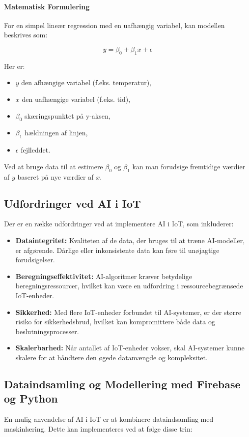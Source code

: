 \paragraph{Matematisk Formulering}
For en simpel lineær regression med en uafhængig variabel, kan modellen beskrives som:

\[
y = \beta_0 + \beta_1 x + \epsilon
\]

Her er:
\begin{itemize}
	\item \(y\) den afhængige variabel (f.eks. temperatur),
	\item \(x\) den uafhængige variabel (f.eks. tid),
	\item \(\beta_0\) skæringspunktet på y-aksen,
	\item \(\beta_1\) hældningen af linjen,
	\item \(\epsilon\) fejlleddet.
\end{itemize}
\noindent Ved at bruge data til at estimere \(\beta_0\) og \(\beta_1\) kan man forudsige fremtidige værdier af \(y\) baseret på nye værdier af \(x\).

\subsection{Udfordringer ved AI i IoT}
Der er en række udfordringer ved at implementere AI i IoT, som inkluderer:
\begin{itemize}
	\item \textbf{Dataintegritet:} Kvaliteten af de data, der bruges til at træne AI-modeller, er afgørende. Dårlige eller inkonsistente data kan føre til unøjagtige forudsigelser.
	\item \textbf{Beregningseffektivitet:} AI-algoritmer kræver betydelige beregningsressourcer, hvilket kan være en udfordring i ressourcebegrænsede IoT-enheder.
	\item \textbf{Sikkerhed:} Med flere IoT-enheder forbundet til AI-systemer, er der større risiko for sikkerhedsbrud, hvilket kan kompromittere både data og beslutningsprocesser.
	\item \textbf{Skalerbarhed:} Når antallet af IoT-enheder vokser, skal AI-systemer kunne skalere for at håndtere den øgede datamængde og kompleksitet.
\end{itemize}

\subsection{Dataindsamling og Modellering med Firebase og Python}
En mulig anvendelse af AI i IoT er at kombinere dataindsamling med maskinlæring. Dette kan implementeres ved at følge disse trin:


